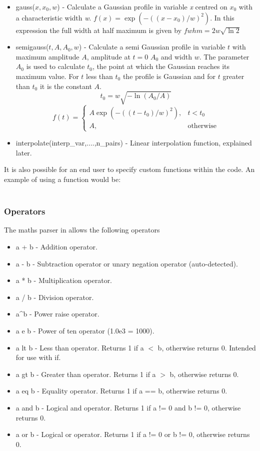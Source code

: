 \documentclass[12pt,a4paper]{article}
\newcommand{\inlinecode}[1]{{\color{warwickred} \bf\texttt{#1}}}
\newcommand{\EPOCH}{{\color{warwickdark}\fontfamily{phv}\selectfont{EPOCH}}}
\begin{document}
\begin{itemize}
\item gauss($x,x_0,w$) - Calculate a Gaussian profile in variable
    {\it x} centred on {\it $x_0$} with a characteristic width {\it w}.
    $f(x) = \exp{(-((x-x_0)/w)^2)}$. In this expression the
    full width at half maximum is given by $fwhm = 2 w \sqrt{\ln{2}}$
\item semigauss($t,A,A_0,w$) - Calculate a semi Gaussian profile in variable
    $t$ with maximum amplitude $A$, amplitude at $t=0$ $A_0$ and width $w$.
    The parameter $A_0$ is used to calculate $t_0$, the point at which the
    Gaussian reaches its maximum value. For $t$ less than $t_0$ the profile
    is Gaussian and for $t$ greater than $t_0$ it is the constant $A$.
\[
t_0 = w\sqrt{-\ln{(A_0/A)}}
\]\[
f(t) =
\begin{cases}
A \exp{(-((t-t_0)/w)^2)}, & t < t_0 \\
A, & \mbox{otherwise}
\end{cases}
\]
\item interpolate(interp\_var,....,n\_pairs) - Linear interpolation function,
  explained later.
\end{itemize}

It is also possible for an end user to specify custom functions within the
code. An example of using a function would be:\\
\indent\inlinecode{length\_x = exp(pi)}\\

\subsubsection{Operators}
The maths parser in {\EPOCH} allows the following operators
\begin{itemize}
\item a + b - Addition operator.
\item a - b - Subtraction operator or unary negation operator (auto-detected).
\item a * b - Multiplication operator.
\item a / b - Division operator.
\item a\^{}b - Power raise operator.
\item a e b - Power of ten operator (1.0e3 = 1000).
\item a lt b - Less than operator. Returns 1 if a $<$ b, otherwise returns
  0. Intended for use with if.
\item a gt b - Greater than operator. Returns 1 if a $>$ b, otherwise returns 0.
\item a eq b - Equality operator. Returns 1 if a == b, otherwise returns 0.
\item a and b - Logical and operator. Returns 1 if a != 0 and b != 0,
  otherwise returns 0.
\item a or b - Logical or operator. Returns 1 if a != 0 or b != 0, otherwise
  returns 0.
\end{itemize}
\end{document}

